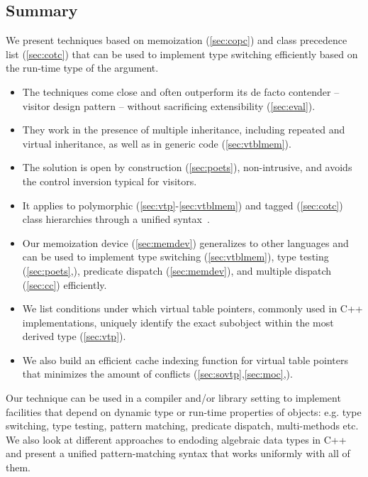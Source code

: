 \documentclass[preprint]{sigplanconf}
\begin{document}
\subsection{Summary}

We present techniques based on memoization (\textsection\ref{sec:copc}) and 
class precedence list (\textsection\ref{sec:cotc}) that can be used to implement 
type switching efficiently based on the run-time type of the argument.

  \begin{itemize}
  \setlength{\itemsep}{0pt}
  \setlength{\parskip}{0pt}
  \item The techniques come close and often outperform its de facto contender -- 
        visitor design pattern -- without sacrificing extensibility (\textsection\ref{sec:eval}).
  \item They work in the presence of multiple inheritance, including repeated and 
        virtual inheritance, as well as in generic code (\textsection\ref{sec:vtblmem}).
  \item The solution is open by construction (\textsection\ref{sec:poets}), 
        non-intrusive, and avoids the control inversion typical for visitors.
  \item It applies to polymorphic (\textsection\ref{sec:vtp}-\ref{sec:vtblmem}) and 
        tagged (\textsection\ref{sec:cotc}) class hierarchies through a unified  
        syntax~\cite{AP}.
  \item Our memoization device (\textsection\ref{sec:memdev}) generalizes to 
        other languages and can be used to implement type switching 
        (\textsection\ref{sec:vtblmem}), type testing 
        (\textsection\ref{sec:poets},\cite[]{TR}), predicate dispatch 
        (\textsection\ref{sec:memdev}), and multiple dispatch 
        (\textsection\ref{sec:cc}) efficiently.
  \item We list conditions under which virtual table pointers, commonly used in 
        C++ implementations, uniquely identify the exact subobject within the 
        most derived type (\textsection\ref{sec:vtp}).
  \item We also build an efficient cache indexing function for virtual table 
        pointers that minimizes the amount of conflicts 
        (\textsection\ref{sec:sovtp},\ref{sec:moc},\cite[.5]{TR}).
  \end{itemize}

\noindent
Our technique can be used in a compiler and/or library setting to implement 
facilities that depend on dynamic type or run-time properties of objects: e.g. 
type switching, type testing, pattern matching, predicate dispatch, 
multi-methods etc. We also look at different approaches to endoding algebraic 
data types in C++ and present a unified pattern-matching syntax that works 
uniformly with all of them. 
\end{document}
